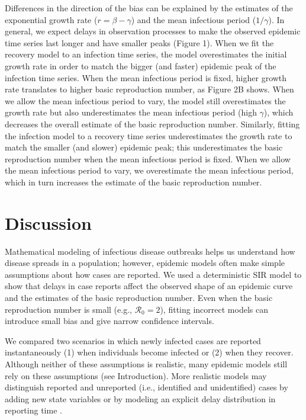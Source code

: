 \documentclass[12pt]{article}\usepackage[]{graphicx}\usepackage[]{color}
\begin{document}
Differences in the direction of the bias can be explained by the estimates of the
exponential growth rate ($r = \beta - \gamma$) and the mean infectious period ($1/\gamma$).
In general, we expect delays in observation processes to make the observed epidemic 
time series last longer and have smaller peaks (Figure 1).
When we fit the recovery model to an infection time series, the model overestimates
the initial growth rate in order to match the bigger (and faster) epidemic peak of the 
infection time series. When the mean infectious period is fixed, higher growth rate
translates to higher basic reproduction number, as Figure 2B shows. When we allow
the mean infectious period to vary, the model still overestimates the growth rate but
also underestimates the mean infectious period (high $\gamma$), 
which decreases the overall estimate of the basic reproduction number.
Similarly, fitting the infection model to a recovery time series underestimates
the growth rate to match the smaller (and slower) epidemic peak; this 
underestimates the basic reproduction number when the mean infectious period is fixed. 
When we allow the mean infectious period to vary, we overestimate the mean infectious
period, which in turn increases the estimate of the basic reproduction number.

\section{Discussion}

Mathematical modeling of infectious disease outbreaks helps us understand how disease spreads in a population; 
however, epidemic models often make simple assumptions about how cases are reported. 
We used a deterministic SIR model to show that delays in case reports affect the observed shape of an epidemic curve and the estimates of the basic reproduction number.
Even when the basic reproduction number is small (e.g., $\mathcal R_0 = 2$), fitting incorrect models can introduce small bias and give narrow confidence intervals.

We compared two scenarios in which newly infected cases are reported 
instantaneously (1) when individuals become infected or
(2) when they recover. Although neither of these
assumptions is realistic, many epidemic models still rely on these
assumptions (see Introduction). 
More realistic models may distinguish reported and unreported
(i.e., identified and unidentified) cases by adding
new state variables \citep{browne2015modeling,webb2015model} 
or by modeling an explicit delay distribution in reporting time 
\citep{harris1990reporting, ferguson2001foot, goldstein2009reconstructing,
ster2009epidemiological, birrell2011bayesian, funk2018real}.
\end{document}
